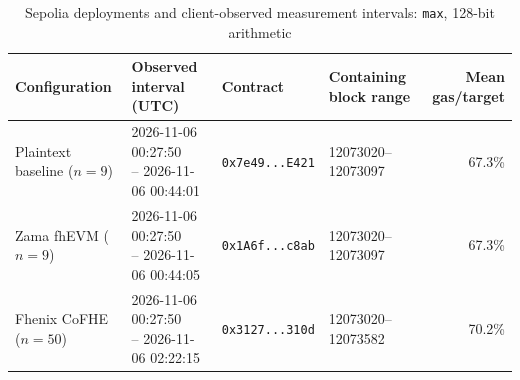 \begin{table}[!t]
\caption{Sepolia deployments and client-observed measurement intervals: \texttt{max}, 128-bit arithmetic}
\label{tab:sepolia-client-intervals-classic-euint128-max}
\centering
\footnotesize
\setlength{\tabcolsep}{4pt}
\begin{tabular}{|l|l|l|l|r|}
\hline
\textbf{Configuration} &
\textbf{Observed interval (UTC)} &
\textbf{Contract} &
\textbf{Containing block range} &
\textbf{Mean gas/target} \\
\hline
Plaintext baseline (\(n=9\)) &
\shortstack[l]{2026-11-06 00:27:50 \\ -- 2026-11-06 00:44:01} &
\texttt{0x7e49...E421} &
12073020--12073097 &
67.3\% \\
\hline
Zama fhEVM (\(n=9\)) &
\shortstack[l]{2026-11-06 00:27:50 \\ -- 2026-11-06 00:44:05} &
\texttt{0x1A6f...c8ab} &
12073020--12073097 &
67.3\% \\
\hline
Fhenix CoFHE (\(n=50\)) &
\shortstack[l]{2026-11-06 00:27:50 \\ -- 2026-11-06 02:22:15} &
\texttt{0x3127...310d} &
12073020--12073582 &
70.2\% \\
\hline
\end{tabular}
\end{table}
